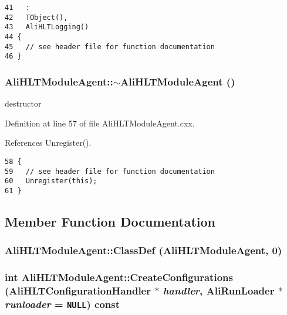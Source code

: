 \footnotesize\begin{verbatim}41   :
42   TObject(),
43   AliHLTLogging()
44 {
45   // see header file for function documentation
46 }

\end{verbatim}\normalsize 


\subsubsection{\setlength{\rightskip}{0pt plus 5cm}Ali\-HLTModule\-Agent::$\sim${\bf Ali\-HLTModule\-Agent} ()\hspace{0.3cm}{\tt  [virtual]}}\label{classAliHLTModuleAgent_a3}


destructor 

Definition at line 57 of file Ali\-HLTModule\-Agent.cxx.

References Unregister().

\footnotesize\begin{verbatim}58 {
59   // see header file for function documentation
60   Unregister(this);
61 }
\end{verbatim}\normalsize 




\subsection{Member Function Documentation}
\subsubsection{\setlength{\rightskip}{0pt plus 5cm}Ali\-HLTModule\-Agent::Class\-Def ({\bf Ali\-HLTModule\-Agent}, 0)\hspace{0.3cm}{\tt  [private]}}\label{classAliHLTModuleAgent_d0}


\subsubsection{\setlength{\rightskip}{0pt plus 5cm}int Ali\-HLTModule\-Agent::Create\-Configurations ({\bf Ali\-HLTConfiguration\-Handler} $\ast$ {\em handler}, Ali\-Run\-Loader $\ast$ {\em runloader} = {\tt NULL}) const\hspace{0.3cm}{\tt  [virtual]}}\label{classAliHLTModuleAgent_a4}


